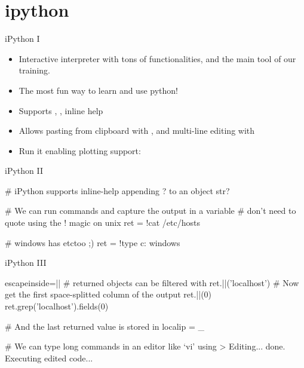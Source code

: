 \section{ipython}



\begin{pyframe}{iPython I}
\begin{itemize}
\item Interactive interpreter with tons of                                                                                                        functionalities, and the main tool of our training.                                                                                                      
\item   The most fun way to learn and use python!

\item   Supports , , inline help 

\item   Allows pasting from clipboard with  , 
    and multi-line editing with 

\item   Run it enabling plotting support: \\
\end{itemize}

\end{pyframe}


\begin{pyframe}{iPython II}
\begin{pycode}
# iPython supports inline-help appending ? to an object
str?

# We can run commands and capture the output in a variable
# don't need to quote using the ! magic on unix
ret = !cat /etc/hosts

# windows has etc\hosts too ;)
ret = !type c: windows\drivers\etc\hosts
\end{pycode}
\end{pyframe}


\begin{pyframe}{iPython III}
\begin{pycode*}{escapeinside=||}
# returned objects can be filtered with  
ret.||('localhost')
# Now get the first space-splitted column of the output
ret.||(0)
ret.grep('localhost').fields(0)

# And the last returned value is stored in 
localip = _

# We can type long commands in an editor like `vi' using
> Editing... done. Executing edited code...

\end{pycode*}
\end{pyframe}

